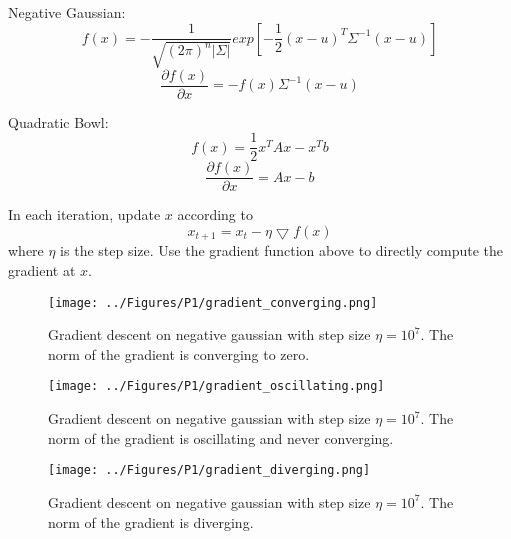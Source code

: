 \documentclass[a4paper,twoside]{article}
\begin{document}
\medskip
\noindent Negative Gaussian:
\begin{equation}
f(x) = - \frac{1}{\sqrt{(2\pi)^n |\Sigma|}} exp[-\frac{1}{2} (x-u)^T\Sigma^{-1}(x-u)]
\end{equation}
\begin{equation}
\frac{\partial f(x)}{\partial x} = -f(x) \Sigma^{-1} (x-u)
\end{equation}

\noindent Quadratic Bowl:
\begin{equation}
f(x) = \frac{1}{2} x^T A x - x^T b
\end{equation}
\begin{equation}
\frac{\partial f(x)}{\partial x} = Ax - b
\end{equation}

\noindent In each iteration, update $x$ according to 
\begin{equation}
x_{t+1} = x_{t} - \eta \bigtriangledown f(x)
\end{equation}
where $\eta$ is the step size. Use the gradient function above to directly compute the gradient at $x$.

\begin{figure}[h]
  \texttt{[image: ../Figures/P1/gradient\_converging.png]}
  \caption{Gradient descent on negative gaussian with step size $\eta = 10^7$. The norm of the gradient is converging to zero.}
  \label{fig:gradient_converging}
\end{figure}

\begin{figure}[h]
  \texttt{[image: ../Figures/P1/gradient\_oscillating.png]}
  \caption{Gradient descent on negative gaussian with step size $\eta = 10^7$. The norm of the gradient is oscillating and never converging.}
  \label{fig:gradient_oscillating}
\end{figure}

\begin{figure}[h]
  \texttt{[image: ../Figures/P1/gradient\_diverging.png]}
  \caption{Gradient descent on negative gaussian with step size $\eta = 10^7$. The norm of the gradient is diverging.}
  \label{fig:gradient_converging}
\end{figure}
\end{document}
